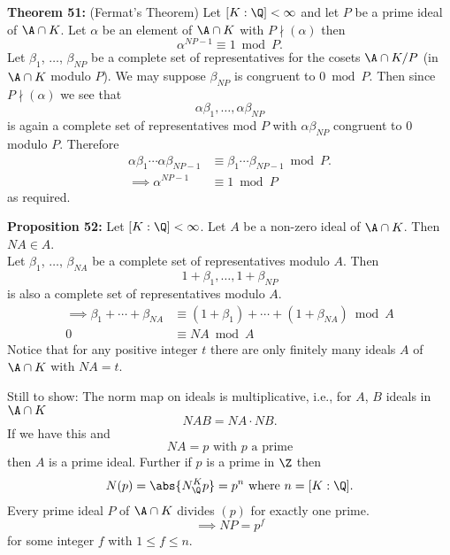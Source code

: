 \textbf{Theorem 51:} (Fermat's Theorem) Let $[K:\Q]<\infty$ and let $P$ be a prime ideal of $\A\cap K$.  Let $\alpha$ be an element of $\A\cap K$ with $P\nmid(\alpha)$ then
\[ \alpha^{NP-1} \equiv 1 \bmod P . \]
\pf Let $\beta_1$, $\dotsc$, $\beta_{NP}$ be a complete set of representatives for the cosets $\A\cap K/P$ (in $\A\cap K$ modulo $P$).  We may suppose $\beta_{NP}$ is congruent to $0\bmod P$.  Then since $P\nmid(\alpha)$ we see that
\[ \alpha\beta_1,\dotsc,\alpha\beta_{NP} \]
is again a complete set of representatives mod $P$ with $\alpha\beta_{NP}$ congruent to $0$ modulo $P$.  Therefore
\begin{align*}
\alpha\beta_1\dotsm\alpha\beta_{NP-1} &\equiv \beta_1\dotsm\beta_{NP-1} \bmod{P} . \\
\implies \alpha^{NP-1} &\equiv 1 \bmod{P}
\end{align*}
as required.

\textbf{Proposition 52:} Let $[K:\Q]<\infty$.  Let $A$ be a non-zero ideal of $\A\cap K$.  Then $NA\in A$. \\
\pf Let $\beta_1$, $\dotsc$, $\beta_{NA}$ be a complete set of representatives modulo $A$.  Then
\[ 1+\beta_1,\dotsc,1+\beta_{NP} \]
is also a complete set of representatives modulo $A$.
\begin{align*}
\implies \beta_1 + \dotsb + \beta_{NA} &\equiv (1+\beta_1) + \dotsb + (1+\beta_{NA}) \bmod{A} \\
0 &\equiv NA \bmod A
\end{align*}
Notice that for any positive integer $t$ there are only finitely many ideals $A$ of $\A\cap K$ with $NA=t$.

Still to show: The norm map on ideals is multiplicative, i.e., for $A$, $B$ ideals in $\A\cap K$
\[ NAB = NA\cdot NB . \]
If we have this and
\[ NA = p \text{ with $p$ a prime} \]
then $A$ is a prime ideal.  Further if $p$ is a prime in $\Z$ then 
\[ N(p) = \abs{N_\Q^K p} = p^n \text{ where $n=[K:\Q]$} . \]
Every prime ideal $P$ of $\A\cap K$ divides $(p)$ for exactly one prime.
\[ \implies NP = p^f \]
for some integer $f$ with $1\leq f\leq n$.
